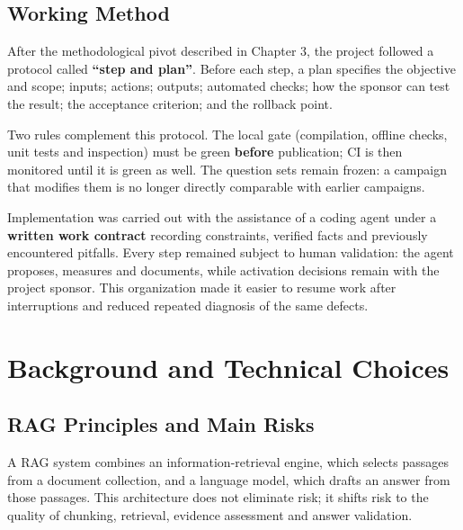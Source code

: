 \documentclass[a4paper,12pt,openany]{report}
\begin{document}
\section{Working Method}
After the methodological pivot described in Chapter 3, the project followed a protocol called
\textbf{“step and plan”}. Before each step, a plan specifies the objective and scope; inputs;
actions; outputs; automated checks; how the sponsor can test the result; the acceptance criterion;
and the rollback point.

Two rules complement this protocol. The local gate (compilation, offline checks, unit tests and
inspection) must be green \textbf{before} publication; CI is then monitored until it is green as
well. The question sets remain frozen: a campaign that modifies them is no longer directly
comparable with earlier campaigns.

Implementation was carried out with the assistance of a coding agent under a \textbf{written work
contract} recording constraints, verified facts and previously encountered pitfalls. Every step
remained subject to human validation: the agent proposes, measures and documents, while activation
decisions remain with the project sponsor. This organization made it easier to resume work after
interruptions and reduced repeated diagnosis of the same defects.

\chapter{Background and Technical Choices}

\section{RAG Principles and Main Risks}
A RAG system combines an information-retrieval engine, which selects passages from a document
collection, and a language model, which drafts an answer from those passages. This architecture
does not eliminate risk; it shifts risk to the quality of chunking, retrieval, evidence assessment
and answer validation.
\end{document}
